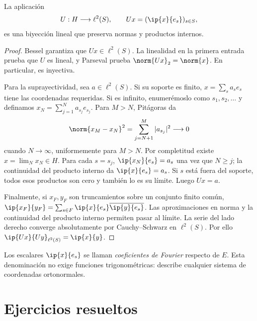 \begin{teorema}\label{ch31:rieszfischer}
La aplicación
\[
 U:H\longrightarrow\ell^{2}(S),\qquad Ux=(\ip{x}{e_s})_{s\in S},
\]
es una biyección lineal que preserva normas y productos internos.
\end{teorema}
\begin{proof}
Bessel garantiza que $Ux\in\ell^{2}(S)$. La linealidad en la primera entrada prueba que $U$ es lineal, y Parseval prueba $\norm{Ux}_2=\norm{x}$. En particular, es inyectiva.

Para la suprayectividad, sea $a\in\ell^{2}(S)$. Si su soporte es finito, $x=\sum_s a_se_s$ tiene las coordenadas requeridas. Si es infinito, enumerémoslo como $s_1,s_2,\dots$ y definamos $x_N=\sum_{j=1}^{N}a_{s_j}e_{s_j}$. Para $M>N$, Pitágoras da
\[
 \norm{x_M-x_N}^{2}=\sum_{j=N+1}^{M}|a_{s_j}|^{2}\longrightarrow0
\]
cuando $N\to\infty$, uniformemente para $M>N$. Por completitud existe $x=\lim_Nx_N\in H$. Para cada $s=s_j$, $\ip{x_N}{e_s}=a_s$ una vez que $N\geq j$; la continuidad del producto interno da $\ip{x}{e_s}=a_s$. Si $s$ está fuera del soporte, todos esos productos son cero y también lo es su límite. Luego $Ux=a$.

Finalmente, si $x_F,y_F$ son truncamientos sobre un conjunto finito común, $\ip{x_F}{y_F}=\sum_{s\in F}\ip{x}{e_s}\overline{\ip{y}{e_s}}$. Las aproximaciones en norma y la continuidad del producto interno permiten pasar al límite. La serie del lado derecho converge absolutamente por Cauchy--Schwarz en $\ell^{2}(S)$. Por ello $\ip{Ux}{Uy}_{\ell^{2}(S)}=\ip{x}{y}$.
\end{proof}
Los escalares $\ip{x}{e_s}$ se llaman \emph{coeficientes de Fourier} respecto de $E$. Esta denominación no exige funciones trigonométricas: describe cualquier sistema de coordenadas ortonormales.

\section{Ejercicios resueltos}


